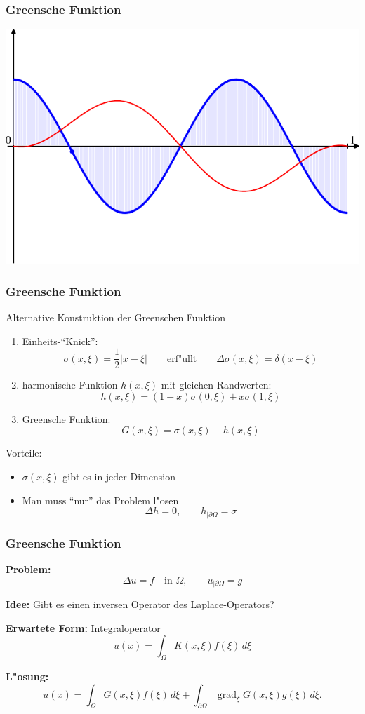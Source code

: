 \documentclass{beamer}
\begin{document}
\begin{frame}
\frametitle{Greensche Funktion}
\includegraphics[width=\hsize]{../../skript/graphics/green-1082.pdf}
\end{frame}

\begin{frame}
\frametitle{Greensche Funktion}
Alternative Konstruktion der Greenschen Funktion
\begin{enumerate}[<+->]
\item Einheits-``Knick'':
\[
\sigma(x,\xi)=\frac12|x-\xi|\qquad\text{erf"ullt}\qquad \Delta\sigma(x,\xi)=\delta(x-\xi)
\]
\item harmonische Funktion $h(x,\xi)$ mit gleichen Randwerten:
\[
h(x,\xi)=(1-x)\sigma(0,\xi) + x\sigma(1,\xi)
\]
\item Greensche Funktion:
\[
G(x,\xi) = \sigma(x,\xi) - h(x,\xi)
\]
\end{enumerate}
\pause
Vorteile:
\begin{itemize}[<+->]
\item
$\sigma(x,\xi)$ gibt es in jeder Dimension
\item
Man muss ``nur'' das Problem l"osen
\[
\Delta h = 0, \qquad h_{|\partial\Omega}=\sigma
\]
\end{itemize}
\end{frame}


\begin{frame}
\frametitle{Greensche Funktion}
{\bf Problem:}
\[
\Delta u=f\quad\text{in $\Omega$},\qquad u_{|\partial\Omega}=g
\]
\bigskip

{\bf Idee:} Gibt es einen inversen Operator des Laplace-Operators?
\bigskip

\pause
{\bf Erwartete Form:} Integraloperator
\[
u(x)=\int_\Omega K(x,\xi)f(\xi)\,d\xi
\]
\medskip

\pause
{\bf L"osung:}
\[
u(x)
=
\int_{\Omega} G(x,\xi)f(\xi)\,d\xi
+
\int_{\partial\Omega}  \operatorname{grad}_\xi G(x,\xi) g(\xi)\,d\xi.
\]

\end{frame}
\end{document}
